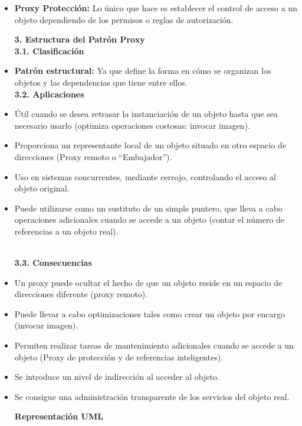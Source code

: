 \begin{flushleft}
\begin{itemize}
 \item	\textbf {Proxy Protección:} Lo único que hace es establecer el control de acceso a un objeto dependiendo de los permisos o reglas de autorización.


\textbf {3.	Estructura del Patrón Proxy}
\textbf{}\\

\textbf {3.1.	Clasificación}
\textbf{}\\
\item	\textbf {Patrón estructural:} Ya que define la forma en cómo se organizan los objetos y las dependencias que tiene entre ellos.
\textbf{}\\
\textbf {3.2.	Aplicaciones}
\textbf{}\\

\item Útil cuando se desea retrasar la instanciación de un objeto hasta que sea necesario usarlo (optimiza operaciones costosas: invocar imagen). 
\item Proporciona un representante local de un objeto situado en otro espacio de direcciones (Proxy remoto o “Embajador”). 
\item Uso en sistemas concurrentes, mediante cerrojo, controlando el acceso al objeto original. 
\item Puede utilizarse como un sustituto de un simple puntero, que lleva a cabo operaciones adicionales cuando se accede a un objeto (contar el número de referencias a un objeto real).

\textbf{}\\
\textbf {3.3.	Consecuencias}
\textbf{}\\
\item Un proxy puede ocultar el hecho de que un objeto reside en un espacio de direcciones diferente (proxy remoto). 
\item Puede llevar a cabo optimizaciones tales como crear un objeto por encargo (invocar imagen). 
\item Permiten realizar tareas de mantenimiento adicionales cuando se accede a un objeto (Proxy de protección y de referencias inteligentes).
\item Se introduce un nivel de indirección al acceder al objeto.
\item Se consigue una administración transparente de los servicios del objeto real. 
\begin{center}
\textbf {Representación UML}
\end{center}
\begin{center}


\end{center}
\end{itemize}
\end{flushleft}
